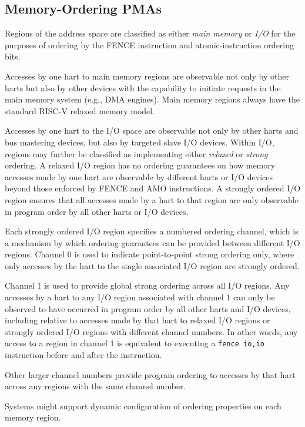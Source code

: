 \subsection{Memory-Ordering PMAs}

Regions of the address space are classified as either {\em main
  memory} or {\em I/O} for the purposes of ordering by the FENCE
instruction and atomic-instruction ordering bits.

Accesses by one hart to main memory regions are observable not only by
other harts but also by other devices with the capability to initiate
requests in the main memory system (e.g., DMA engines).  Main memory
regions always have the standard RISC-V relaxed memory model.

Accesses by one hart to the I/O space are observable not only by other
harts and bus mastering devices, but also by targeted slave I/O
devices.  Within I/O, regions may further be classified as
implementing either {\em relaxed} or {\em strong} ordering.  A relaxed
I/O region has no ordering guarantees on how memory accesses made by
one hart are observable by different harts or I/O devices beyond those
enforced by FENCE and AMO instructions.  A strongly ordered I/O region
ensures that all accesses made by a hart to that region are only
observable in program order by all other harts or I/O devices.

Each strongly ordered I/O region specifies a numbered ordering
channel, which is a mechanism by which ordering guarantees can be
provided between different I/O regions.  Channel 0 is used to indicate
point-to-point strong ordering only, where only accesses by the hart to the
single associated I/O region are strongly ordered.

Channel 1 is used to provide global strong ordering across all I/O
regions.  Any accesses by a hart to any I/O region associated with
channel 1 can only be observed to have occurred in program order by all
other harts and I/O devices, including relative to accesses made by
that hart to relaxed I/O regions or strongly ordered I/O regions with
different channel numbers.  In other words, any access to a region in
channel 1 is equivalent to executing a {\tt fence io,io}
instruction before and after the instruction.

Other larger channel numbers provide program ordering to accesses by
that hart across any regions with the same channel number.

Systems might support dynamic configuration of ordering properties on
each memory region.

